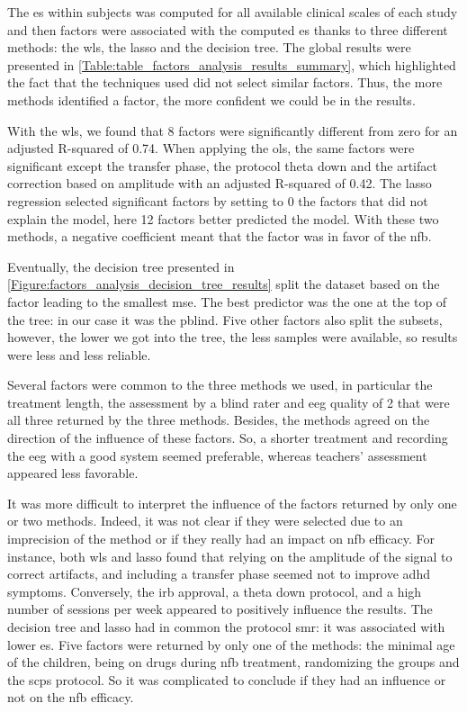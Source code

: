 The \gls{es} within subjects was computed for all available clinical scales of each study and then factors were associated with the computed \gls{es}
thanks to three different methods: the \gls{wls}, the \gls{lasso} and the decision tree. The global results were presented in \ref{Table:table_factors_analysis_results_summary},
which highlighted the fact that the techniques used did not select similar factors. Thus, the more methods identified a factor, the more confident we could be in
the results.  

With the \gls{wls}, we found that 8 factors were significantly different from zero for an adjusted R-squared of 0.74. 
When applying the \gls{ols}, the same factors were significant except the transfer phase, the protocol theta down and the artifact correction
based on amplitude with an adjusted R-squared of 0.42. The \gls{lasso} regression selected significant factors by setting to 0 the factors that did
not explain the model, here 12 factors better predicted the model. With these two methods, a negative coefficient meant that the factor was in favor of the \gls{nfb}.

Eventually, the decision tree presented in \ref{Figure:factors_analysis_decision_tree_results} split the dataset based on the factor leading to the
smallest \gls{mse}. The best predictor was the one at the top of the tree: in our case it was the \gls{pblind}. Five other factors also split the subsets,  
however, the lower we got into the tree, the less samples were available, so results were less and less reliable.

Several factors were common to the three methods we used, in particular the treatment length, the assessment 
by a blind rater and \gls{eeg} quality of 2 that were all three returned by the three methods. Besides, 
the methods agreed on the direction of the influence of these factors. So, a shorter treatment and recording the \gls{eeg} 
with a good system seemed preferable, whereas teachers' assessment appeared less favorable.

It was more difficult to interpret the influence of the factors returned by only one or two methods. Indeed, it was not clear if they were
selected due to an imprecision of the method or if they really had an impact on \gls{nfb} efficacy.
For instance, both \gls{wls} and \gls{lasso} found that relying on the amplitude of the signal to correct artifacts, and including a 
transfer phase seemed not to improve \gls{adhd} symptoms. Conversely, the \gls{irb} approval, a theta down protocol, and a high number 
of sessions per week appeared to positively influence the results. The decision tree and \gls{lasso} had in common the protocol \gls{smr}:
it was associated with lower \gls{es}. Five factors were returned by only one of the methods: the minimal age of the children, being on drugs 
during \gls{nfb} treatment, randomizing the groups and the \glspl{scp} protocol. So it was complicated to conclude if they had an influence or not
on the \gls{nfb} efficacy.

